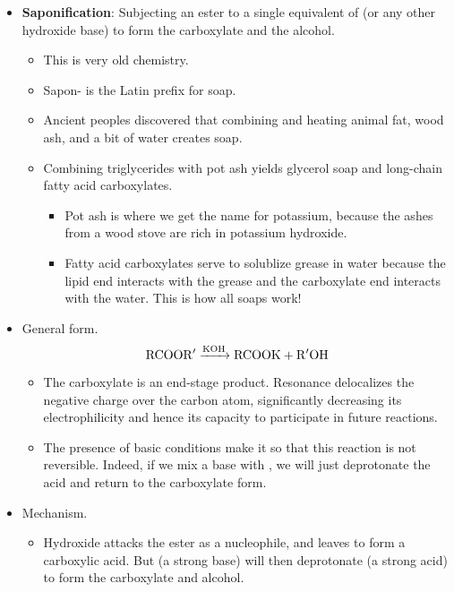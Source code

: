 \documentclass[../notes.tex]{subfiles}
\begin{document}
\begin{itemize}
    \item \textbf{Saponification}: Subjecting an ester to a single equivalent of  (or any other hydroxide base) to form the carboxylate and the alcohol.
    \begin{itemize}
        \item This is very old chemistry.
        \item Sapon- is the Latin prefix for soap.
        \item Ancient peoples discovered that combining and heating animal fat, wood ash, and a bit of water creates soap.
        \item Combining triglycerides with pot ash yields glycerol soap and long-chain fatty acid carboxylates.
        \begin{itemize}
            \item Pot ash is where we get the name for potassium, because the ashes from a wood stove are rich in potassium hydroxide.
            \item Fatty acid carboxylates serve to solublize grease in water because the lipid end interacts with the grease and the carboxylate end interacts with the water. This is how all soaps work!
        \end{itemize}
    \end{itemize}
    \item General form.
    \begin{equation*}
        \ce{RCOOR$'$ ->[KOH] RCOOK + R$'$OH}
    \end{equation*}
    \begin{itemize}
        \item The carboxylate is an end-stage product. Resonance delocalizes the negative charge over the carbon atom, significantly decreasing its electrophilicity and hence its capacity to participate in future reactions.
        \item The presence of basic conditions make it so that this reaction is not reversible. Indeed, if we mix a base with , we will just deprotonate the acid and return to the carboxylate form.
    \end{itemize}
    \item Mechanism.
    \begin{itemize}
        \item Hydroxide attacks the ester as a nucleophile, and  leaves to form a carboxylic acid. But  (a strong base) will then deprotonate  (a strong acid) to form the carboxylate and alcohol.
    \end{itemize}

\end{itemize}
\end{document}
